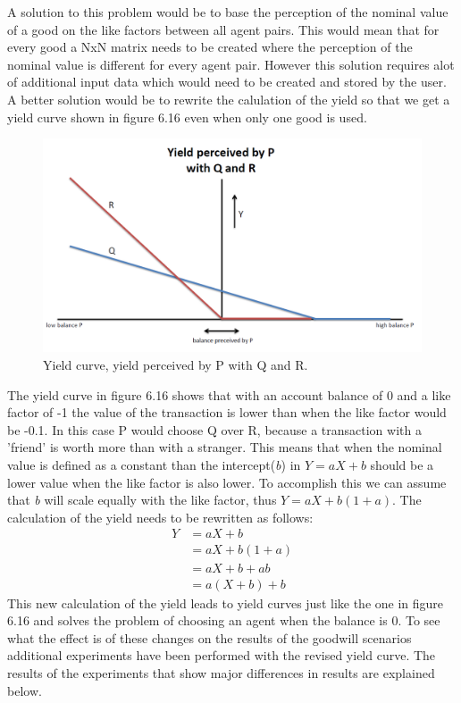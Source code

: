 \documentclass[twoside,openright]{uva-bachelor-thesis}
\begin{document}
A solution to this problem would be to base the perception of the nominal value of a good on the like factors between all agent pairs. This would mean that for every good a NxN matrix needs to be created where the perception of the nominal value is different for every agent pair. However this solution requires alot of additional input data which would need to be created and stored by the user. A better solution would be to rewrite the calulation of the yield so that we get a yield curve shown in figure 6.16 even when only one good is used. \\
\begin{figure}[h!]
 
  \centering
    \includegraphics[scale=0.4]{YieldCurves/yieldcurve_P_QR2}
 \caption{Yield curve, yield perceived by P with Q and R.}
\end{figure}

The yield curve in figure 6.16 shows that with an account balance of 0 and a like factor of -1 the value of the transaction is lower than when the like factor would be -0.1. In this case P would choose Q over R, because a transaction with a 'friend' is worth more than with a stranger. This means that when the nominal value is defined as a constant than the intercept(\textit{b}) in \textit{$Y = aX + b$} should be a lower value when the like factor is also lower. To accomplish this we can assume that \textit{b} will scale equally with the like factor, thus \textit{$Y = aX + b(1 + a)$}.  The calculation of the yield needs to be rewritten as follows:
\begin{equation}
\begin{split}
  Y & = aX + b \\
     & = aX + b(1 + a) \\
     & = aX + b + ab \\
     & = a(X + b) + b 
\end{split}
\end{equation}
This new calculation of the yield leads to yield curves just like the one in figure 6.16 and solves the problem of choosing an agent when the balance is 0. To see what the effect is of these changes on the results of the goodwill scenarios additional experiments have been performed with the revised yield curve. The results of the experiments that show major differences in results are explained below.
\end{document}
